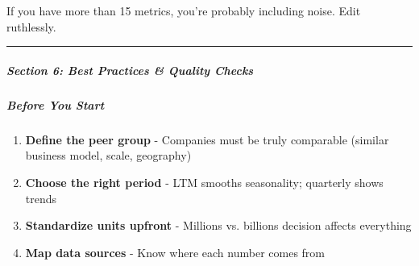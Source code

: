\documentclass[11pt]{article}
\begin{document}
If you have more than 15 metrics, you're probably including noise. Edit ruthlessly.


\vspace{0.5em}\hrule\vspace{0.5em}

\subparagraph{Section 6: Best Practices \& Quality Checks}\mbox{}\par

\subparagraph{Before You Start}\mbox{}\par
\begin{enumerate}[leftmargin=*,itemsep=2pt,topsep=2pt]
\item {} \textbf{Define the peer group} - Companies must be truly comparable (similar business model, scale, geography)
\item {} \textbf{Choose the right period} - LTM smooths seasonality; quarterly shows trends
\item {} \textbf{Standardize units upfront} - Millions vs. billions decision affects everything
\item {} \textbf{Map data sources} - Know where each number comes from
\end{enumerate}
\end{document}
